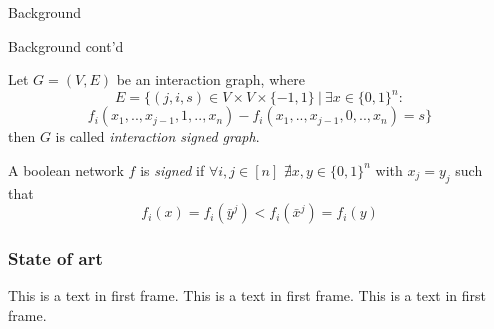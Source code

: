 \documentclass{beamer}
\begin{document}
\begin{section}{Background}
\begin{frame}{Background cont'd}
\end{frame}
\begin{frame}
    \begin{definition}
        Let $G=(V,E)$ be an interaction graph, where
        \[
        E = \{(j,i,s) \in V \times V \times \{-1,1\}\ |\ \exists x \in \{0,1\}^n : \]\[
        f_i(x_1,..,x_{j-1}, 1,..,x_n)-f_i(x_1,..,x_{j-1}, 0,..,x_n)=s \}
        \]
        then $G$ is called \textit{interaction signed graph}.
    \end{definition}
\end{frame}

\begin{frame}
\begin{definition}
	A boolean network $f$ is \textit{signed} if $\forall i,j \in [n]$ $\nexists x,y \in \{0,1\}^n$ with $x_j = y_j$ such that 
	\[
	f_i(x) = f_i(\bar{y}^j) < f_i(\bar{x}^j) = f_i(y)
	\]
\end{definition}
\end{frame}

\end{section}

\begin{frame}
\frametitle{State of art}
This is a text in first frame. This is a text in first frame. This is a text in first frame.
\end{frame}
\end{document}
